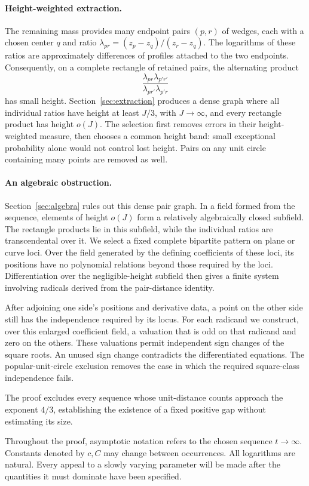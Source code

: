 \paragraph{Height-weighted extraction.}
The remaining mass provides many endpoint pairs \((p,r)\) of wedges,
each with a chosen center \(q\) and ratio
\(\lambda_{pr}=(z_p-z_q)/(z_r-z_q)\).
The logarithms of these ratios are approximately differences of
profiles attached to the two endpoints. Consequently, on a complete
rectangle of retained pairs, the alternating product
\[
 \frac{\lambda_{pr}\lambda_{p'r'}}{\lambda_{pr'}\lambda_{p'r}}
\]
has small height. Section~\ref{sec:extraction} produces a dense graph
where all individual ratios have height at least \(J/3\), with
\(J\to\infty\), and every rectangle product has height \(o(J)\).
The selection first removes errors in their height-weighted measure,
then chooses a common height band: small exceptional probability alone
would not control lost height. Pairs on any unit circle containing
many points are removed as well.

\paragraph{An algebraic obstruction.}
Section~\ref{sec:algebra} rules out this dense pair graph. In a field
formed from the sequence, elements of height \(o(J)\) form a
relatively algebraically closed subfield. The rectangle products lie
in this subfield, while the individual ratios are transcendental over
it. We select a fixed complete bipartite pattern on plane or curve
loci. Over the field generated by the defining coefficients of these
loci, its positions have no polynomial relations beyond those required
by the loci. Differentiation over the negligible-height subfield
then gives a finite system involving radicals derived from the
pair-distance identity.

After adjoining one side's positions and derivative data, a point on
the other side still has the independence required by its locus.
For each radicand we construct, over this enlarged
coefficient field, a valuation that is odd on that radicand and
zero on the others. These valuations permit independent sign changes
of the square roots. An unused sign change contradicts the
differentiated equations. The popular-unit-circle exclusion removes
the case in which the required square-class independence fails.

The proof excludes every sequence whose unit-distance counts approach
the exponent \(4/3\), establishing the existence of a fixed positive
gap without estimating its size.

Throughout the proof, asymptotic notation refers to the chosen sequence
\(t\to\infty\). Constants denoted by \(c,C\) may change between occurrences.
All logarithms are natural. Every appeal to a slowly varying parameter
will be made after the quantities it must dominate have been specified.
